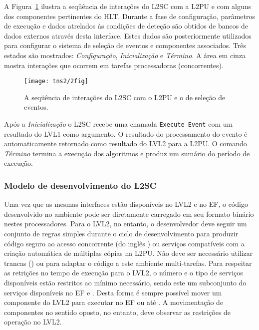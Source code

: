 A Figura~\ref{fig:l2sc-interaction} ilustra a seqüência de interações do L2SC
com a L2PU e com alguns dos componentes pertinentes do HLT. Durante a fase de
configuração, parâmetros de execução e dados atrelados às condições de deteção
são obtidos de bancos de dados externos através desta interface. Estes dados
são posteriormente utilizados para configurar o sistema de seleção de eventos
e componentes associados. Três estados são mostrados: \textit{Configuração},
\textit{Inicialização} e \textit{Término}. A área em cinza mostra interações
que ocorrem em tarefas processadoras (concorrentes).

\begin{figure}
\begin{center}
\texttt{[image: tns2/2fig]}
\end{center}
\caption{A seqüência de interações do L2SC com o L2PU e o  de
seleção de eventos.}
\label{fig:l2sc-interaction}
\end{figure}

Após a \textit{Inicialização} o L2SC recebe uma chamada \texttt{Execute Event}
com um resultado do LVL1 como argumento. O resultado do processamento do
evento é automaticamente retornado como resultado do LVL2 para a L2PU. O
comando \textit{Término} termina a execução dos algoritmos e produz um sumário
do período de execução.

\subsubsection{Modelo de desenvolvimento do L2SC}

Uma vez que as mesmas interfaces estão disponíveis no LVL2 e no EF, o código
desenvolvido no ambiente  pode ser diretamente carregado em seu
formato binário nestes processadores. Para o LVL2, no entanto, o desenvolvedor
deve seguir um conjunto de regras simples \cite{aa:lvl2-coding} durante o
ciclo de desenvolvimento para produzir código seguro ao acesso concorrente (do
inglês ) ou serviços compatíveis com a criação automática de
múltiplas cópias na L2PU. Não deve ser necessário utilizar trancas
() ou  para adaptar o código a este ambiente
multi-tarefas. Para respeitar as retrições no tempo de execução para o LVL2, o
número e o tipo de serviços disponíveis estão restritos ao mínimo necessário,
sendo este um subconjunto do serviços disponíveis no EF e . Desta
forma é sempre possível mover um componente do LVL2 para executar no EF ou até
. A movimentação de componentes no sentido oposto, no entanto,
deve observar as restrições de operação no LVL2. 

